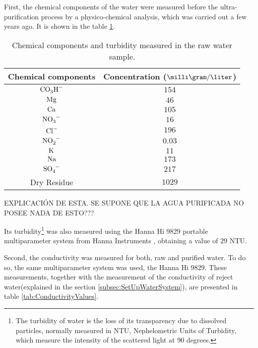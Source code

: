 First, the chemical components of the water were measured before the ultra-purification process by a physico-chemical analysis, which was carried out a few years ago. It is shown in the table \ref{tab:ChemicalComponentsRawWater}.

\begin{table}[htbp]
\begin{center}
\begin{tabular}{|c|c|}
\hline
Chemical components & Concentration ($\milli\gram/\liter$)\\
\hline \hline \hline
$\ce{CO_{3}H^-}$ & $154$ \\ \hline
$\ce{Mg}$ & $46$ \\ \hline
$\ce{Ca}$ & $105$ \\ \hline
$\ce{NO_{3}^-}$ & $16$ \\ \hline
$\ce{Cl^-}$ & $196$ \\ \hline
$\ce{NO_{2}^-}$ & $0.03$ \\ \hline
$\ce{K}$ & $11$ \\ \hline
$\ce{Na}$ & $173$ \\ \hline
$\ce{SO_{4}^-}$ & $217$ \\ \hline
Dry Residue & $1029$ \\ \hline
\end{tabular}
\caption{Chemical components and turbidity measured in the raw water sample.}
\label{tab:ChemicalComponentsRawWater}
\end{center}
\end{table}

EXPLICACIÓN DE ESTA. SE SUPONE QUE LA AGUA PURIFICADA NO POSEE NADA DE ESTO???

Its turbidity\footnote{The turbidity of water is the loss of its transparency due to dissolved particles, normally measured in NTU, Nephelometric Units of Turbidity, which measure the intensity of the scattered light at 90 degrees.} was also measured using the Hanna Hi 9829 portable multiparameter system from Hanna Instruments \cite{TurbiditySystem}, obtaining a value of $29$ NTU.

Second, the conductivity was measured for both, raw and purified water. To do so, the same multiparameter system was used, the Hanna Hi 9829. These measurements, together with the measurement of the conductivity of reject water(explained in the section \ref{subsec:SetUpWaterSystem}), are presented in table \ref{tab:ConductivityValues}.

